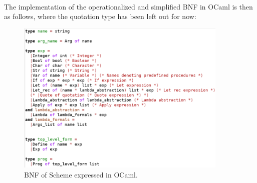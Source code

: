 \\
The implementation of the operationalized and simplified BNF in OCaml is then as follows, where the quotation type has been left out for now:
\begin{figure}[!h]
  \centering
    \includegraphics[width=0.9\textwidth]{figures_progress_report/scheme_types.png}
  \caption{BNF of Scheme expressed in OCaml.}
  \label{fig:scheme_types}
\end{figure}

